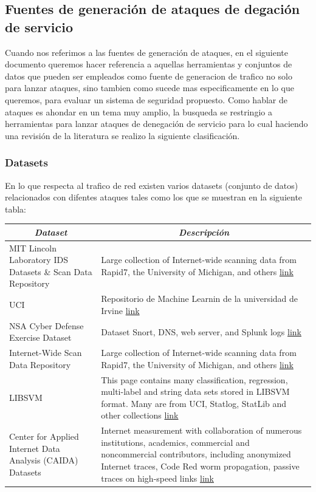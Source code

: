 \documentclass[12pt]{article}
\begin{document}
\subsection{Fuentes de generación de ataques de degación de servicio}

Cuando nos referimos a las fuentes de generación de ataques, en el siguiente documento queremos hacer referencia a aquellas herramientas y conjuntos de datos que pueden ser empleados como fuente de generacion de trafico no solo para lanzar ataques, sino tambien como sucede mas especificamente en lo que queremos, para evaluar un sistema de seguridad propuesto. Como hablar de ataques es ahondar en un tema muy amplio, la busqueda se restringio a herramientas para lanzar ataques de denegación de servicio para lo cual haciendo una revisión de la literatura se realizo la siguiente clasificación.

\subsubsection{Datasets}

En lo que respecta al trafico de red existen varios datasets (conjunto de datos) relacionados con difentes ataques tales como los que se muestran en la siguiente tabla:

\begin{table}[htbp]
\centering
\begin{tabular}{|p{0.3\linewidth}|p{0.7\linewidth}|}
\hline
\multicolumn{1}{|c|}{\textit{\textbf{Dataset}}} & \multicolumn{1}{c|}{\textit{\textbf{Descripción}}} \tabularnewline \hline
MIT Lincoln Laboratory IDS Datasets \& Scan Data Repository & Large collection of Internet-wide scanning data from Rapid7, the University of Michigan, and others \href{https://scans.io/}{link}  \tabularnewline \hline
UCI & Repositorio de Machine Learnin de la universidad de Irvine \href{https://archive.ics.uci.edu/ml/datasets.html}{link}  \tabularnewline \hline
NSA Cyber Defense Exercise Dataset & Dataset Snort, DNS, web server, and Splunk logs \href{https://www.usma.edu/crc/SitePages/DataSets.aspx}{link} \tabularnewline \hline
Internet-Wide Scan Data Repository & Large collection of Internet-wide scanning data from Rapid7, the University of Michigan, and others \href{https://scans.io/}{link} \tabularnewline \hline
LIBSVM & This page contains many classification, regression, multi-label and string data sets stored in LIBSVM format. Many are from UCI, Statlog, StatLib and other collections \href{https://www.csie.ntu.edu.tw/~cjlin/libsvmtools/datasets/}{link}  \tabularnewline \hline
Center for Applied Internet Data Analysis (CAIDA) Datasets & Internet measurement with collaboration of numerous institutions, academics, commercial and noncommercial contributors, including anonymized Internet traces, Code Red worm propagation, passive traces on high-speed links \href{http://www.caida.org/projects/trends/imdc/}{link} \tabularnewline \hline
\end{tabular}
\end{table}
\FloatBarrier
\end{document}
